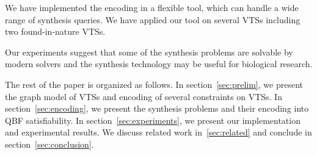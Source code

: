 We have implemented the encoding in a flexible tool,
which can handle a wide range of synthesis queries.
%
We have applied our tool on several VTSs including two found-in-nature
VTSs.
%
% 

Our experiments suggest that some of the synthesis problems are
solvable by modern solvers and the synthesis technology may be useful
for biological research.
%


The rest of the paper is organized as follows.
%
In section~\ref{sec:prelim}, we present the graph model of VTSs and encoding of several
constraints on VTSs.
%
In section~\ref{sec:encoding}, we present the synthesis problems and their
encoding into QBF satisfiability.
%
In section~\ref{sec:experiments}, we present our implementation and experimental results.
%
We discuss related work in~\ref{sec:related} and conclude in section~\ref{sec:conclusion}.

